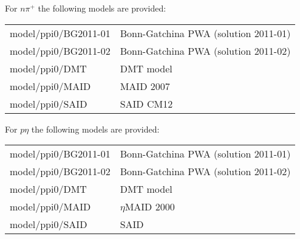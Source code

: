 \documentclass[a4paper,10pt]{article}
\def\tt{\ttfamily}
\def\rm{\rmfamily}
\begin{document}
For $n \pi^+$ the following models are provided: \vspace{-0.25em}\\
\begin{tabular}{ll}
\hspace{-0.5em}\tt model/ppi0/BG2011-01\rm & Bonn-Gatchina PWA (solution 2011-01) \cite{Model_BnGa} \vspace{-0.5em}\\
\hspace{-0.5em}\tt model/ppi0/BG2011-02\rm & Bonn-Gatchina PWA (solution 2011-02) \cite{Model_BnGa} \vspace{-0.5em}\\
\hspace{-0.5em}\tt model/ppi0/DMT\rm & DMT model \cite{Model_DMT} \vspace{-0.5em}\\
\hspace{-0.5em}\tt model/ppi0/MAID\rm & MAID 2007 \cite{Model_MAID} \vspace{-0.5em}\\
\hspace{-0.5em}\tt model/ppi0/SAID\rm & SAID CM12 \cite{Model_SAID} \vspace{-0.1em}\\
\end{tabular}

For $p \eta$ the following models are provided: \vspace{-0.25em}\\
\begin{tabular}{ll}
\hspace{-0.5em}\tt model/ppi0/BG2011-01\rm & Bonn-Gatchina PWA (solution 2011-01) \cite{Model_BnGa} \vspace{-0.5em}\\
\hspace{-0.5em}\tt model/ppi0/BG2011-02\rm & Bonn-Gatchina PWA (solution 2011-02) \cite{Model_BnGa} \vspace{-0.5em}\\
\hspace{-0.5em}\tt model/ppi0/DMT\rm & DMT model \cite{Model_DMT} \vspace{-0.5em}\\
\hspace{-0.5em}\tt model/ppi0/MAID\rm & $\eta$MAID 2000 \cite{Model_MAID} \vspace{-0.5em}\\
\hspace{-0.5em}\tt model/ppi0/SAID\rm & SAID \cite{Model_SAID} \vspace{-0.1em}\\
\end{tabular}
\end{document}
